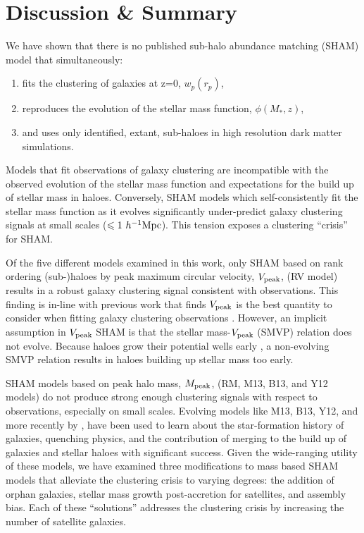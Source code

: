 \documentclass[a4paper,fleqn,usenatbib]{mnras}
\begin{document}
\section{Discussion \& Summary}

We have shown that there is no published sub-halo abundance matching (SHAM) model that simultaneously:
\begin{enumerate}
\item fits the clustering of galaxies at z=0, $w_p(r_p)$,
\item reproduces the evolution of the stellar mass function, $\phi(M_*,z)$,
\item and uses only identified, extant, sub-haloes in high resolution dark matter simulations.
\end{enumerate}
Models that fit observations of galaxy clustering are incompatible with the observed evolution of the stellar mass function and expectations for the build up of stellar mass in haloes.  Conversely, SHAM models which self-consistently fit the stellar mass function as it evolves significantly under-predict galaxy clustering signals at small scales ($\leq 1~h^{-1}{\rm Mpc}$).  This tension exposes a clustering ``crisis'' for SHAM.   

Of the five different models examined in this work, only SHAM based on rank ordering (sub-)haloes by peak maximum circular velocity, $V_{\rm peak}$, (RV  model) results in a robust galaxy clustering signal consistent with observations.  This finding is in-line with previous work that finds $V_{\rm peak}$ is the best quantity to consider when fitting galaxy clustering observations \citep{Reddick:2013gi, Lehmann:2015vi}.  However, an implicit assumption in $V_{\rm peak}$ SHAM is that the stellar mass-$V_{\rm peak}$ (SMVP) relation does not evolve. Because haloes grow their potential wells early \citep[e.g.][]{Bosch:2014cu}, a non-evolving SMVP relation results in haloes building up stellar mass too early.  

SHAM models based on peak halo mass, $M_{\rm peak}$, (RM, M13, B13, and Y12 models) do not produce strong enough clustering signals with respect to observations, especially on small scales.  Evolving models like M13, B13, Y12, and more recently by \citet{RodriguezPuebla:2017uo}, have been used to learn about the star-formation history of galaxies, quenching physics, and the contribution of merging to the build up of galaxies and stellar haloes with significant success.  Given the wide-ranging utility of these models, we have examined three modifications to mass based SHAM models that alleviate the clustering crisis to varying degrees: the addition of orphan galaxies, stellar mass growth post-accretion for satellites, and assembly bias.  Each of these ``solutions'' addresses the clustering crisis by increasing the number of satellite galaxies.
\end{document}
